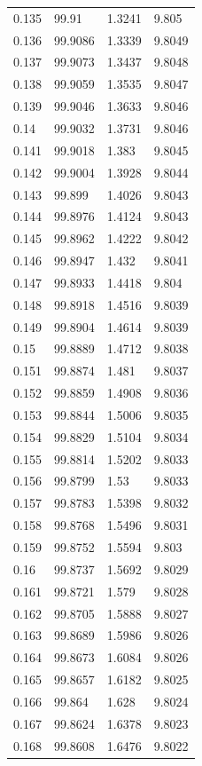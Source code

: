 \begin{tabular}{llll}
0.135 & 99.91 & 1.3241 & 9.805 \\
0.136 & 99.9086 & 1.3339 & 9.8049 \\
0.137 & 99.9073 & 1.3437 & 9.8048 \\
0.138 & 99.9059 & 1.3535 & 9.8047 \\
0.139 & 99.9046 & 1.3633 & 9.8046 \\
0.14 & 99.9032 & 1.3731 & 9.8046 \\
0.141 & 99.9018 & 1.383 & 9.8045 \\
0.142 & 99.9004 & 1.3928 & 9.8044 \\
0.143 & 99.899 & 1.4026 & 9.8043 \\
0.144 & 99.8976 & 1.4124 & 9.8043 \\
0.145 & 99.8962 & 1.4222 & 9.8042 \\
0.146 & 99.8947 & 1.432 & 9.8041 \\
0.147 & 99.8933 & 1.4418 & 9.804 \\
0.148 & 99.8918 & 1.4516 & 9.8039 \\
0.149 & 99.8904 & 1.4614 & 9.8039 \\
0.15 & 99.8889 & 1.4712 & 9.8038 \\
0.151 & 99.8874 & 1.481 & 9.8037 \\
0.152 & 99.8859 & 1.4908 & 9.8036 \\
0.153 & 99.8844 & 1.5006 & 9.8035 \\
0.154 & 99.8829 & 1.5104 & 9.8034 \\
0.155 & 99.8814 & 1.5202 & 9.8033 \\
0.156 & 99.8799 & 1.53 & 9.8033 \\
0.157 & 99.8783 & 1.5398 & 9.8032 \\
0.158 & 99.8768 & 1.5496 & 9.8031 \\
0.159 & 99.8752 & 1.5594 & 9.803 \\
0.16 & 99.8737 & 1.5692 & 9.8029 \\
0.161 & 99.8721 & 1.579 & 9.8028 \\
0.162 & 99.8705 & 1.5888 & 9.8027 \\
0.163 & 99.8689 & 1.5986 & 9.8026 \\
0.164 & 99.8673 & 1.6084 & 9.8026 \\
0.165 & 99.8657 & 1.6182 & 9.8025 \\
0.166 & 99.864 & 1.628 & 9.8024 \\
0.167 & 99.8624 & 1.6378 & 9.8023 \\
0.168 & 99.8608 & 1.6476 & 9.8022 \\

\end{tabular}
